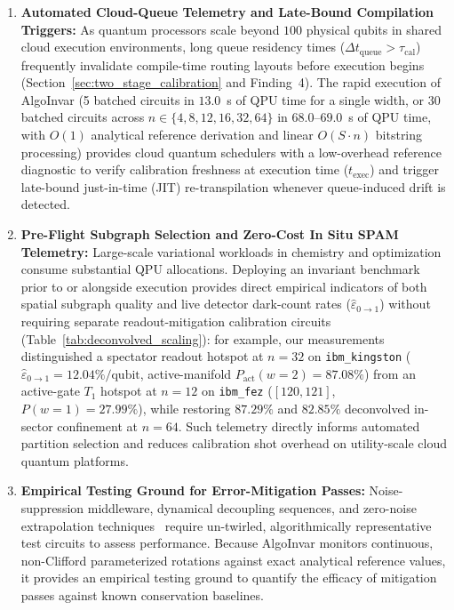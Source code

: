 \documentclass[aps,pra,reprint,superscriptaddress,floatfix,nofootinbib]{revtex4-2}
\begin{document}
\begin{enumerate}
    \item \textbf{Automated Cloud-Queue Telemetry and Late-Bound Compilation Triggers:}
    As quantum processors scale beyond $100$ physical qubits in shared cloud execution environments, long queue residency times ($\Delta t_{\text{queue}} > \tau_{\text{cal}}$) frequently invalidate compile-time routing layouts before execution begins (Section~\ref{sec:two_stage_calibration} and Finding~4). The rapid execution of AlgoInvar (5 batched circuits in $13.0$~s of QPU time for a single width, or 30 batched circuits across $n \in \{4, 8, 12, 16, 32, 64\}$ in $68.0$--$69.0$~s of QPU time, with $O(1)$ analytical reference derivation and linear $O(S \cdot n)$ bitstring processing) provides cloud quantum schedulers with a low-overhead reference diagnostic to verify calibration freshness at execution time ($t_{\text{exec}}$) and trigger late-bound just-in-time (JIT) re-transpilation whenever queue-induced drift is detected.

    \item \textbf{Pre-Flight Subgraph Selection and Zero-Cost In Situ SPAM Telemetry:}
    Large-scale variational workloads in chemistry and optimization consume substantial QPU allocations. Deploying an invariant benchmark prior to or alongside execution provides direct empirical indicators of both spatial subgraph quality and live detector dark-count rates ($\hat{\varepsilon}_{0\to 1}$) without requiring separate readout-mitigation calibration circuits (Table~\ref{tab:deconvolved_scaling}): for example, our measurements distinguished a spectator readout hotspot at $n = 32$ on \texttt{ibm\_kingston} ($\hat{\varepsilon}_{0\to 1} = 12.04\%/\text{qubit}$, active-manifold $P_{\text{act}}(w=2) = 87.08\%$) from an active-gate $T_1$ hotspot at $n = 12$ on \texttt{ibm\_fez} ($[120, 121]$, $P(w=1) = 27.99\%$), while restoring $87.29\%$ and $82.85\%$ deconvolved in-sector confinement at $n = 64$. Such telemetry directly informs automated partition selection and reduces calibration shot overhead on utility-scale cloud quantum platforms.

    \item \textbf{Empirical Testing Ground for Error-Mitigation Passes:}
    Noise-suppression middleware, dynamical decoupling sequences, and zero-noise extrapolation techniques~\cite{Temme2017,Endo2018} require un-twirled, algorithmically representative test circuits to assess performance. Because AlgoInvar monitors continuous, non-Clifford parameterized rotations against exact analytical reference values, it provides an empirical testing ground to quantify the efficacy of mitigation passes against known conservation baselines.


\end{enumerate}
\end{document}
